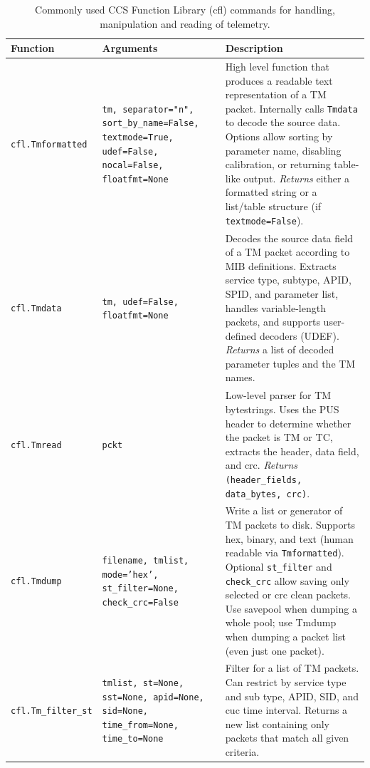 
\begin{table}[h!]
\centering
\renewcommand{\arraystretch}{1.3}
\setlength{\tabcolsep}{8pt}
\begin{tabular}{p{4cm} p{5cm} p{6cm}}
\hline
\textbf{Function} & \textbf{Arguments} & \textbf{Description} \\ 
\hline


\texttt{cfl.Tmformatted} & \texttt{tm, separator="n", sort\_by\_name=False, textmode=True, udef=False, nocal=False, floatfmt=None} &
High level function that produces a readable text representation of a TM packet.  
Internally calls \texttt{Tmdata} to decode the source data.  
Options allow sorting by parameter name, disabling calibration, or returning table-like output.  
\emph{Returns} either a formatted string or a list/table structure (if \texttt{textmode=False}). \\

\texttt{cfl.Tmdata} & \texttt{tm, udef=False, floatfmt=None} &
Decodes the source data field of a TM packet according to MIB definitions.  
Extracts service type, subtype, APID, SPID, and parameter list, handles variable-length packets,  
and supports user-defined decoders (UDEF).  
\emph{Returns} a list of decoded parameter tuples and the TM names. \\

\texttt{cfl.Tmread} & \texttt{pckt} &
Low-level parser for TM bytestrings.  
Uses the PUS header to determine whether the packet is TM or TC, extracts the header, data field, and crc. 
\emph{Returns} \texttt{(header\_fields, data\_bytes, crc)}. \\


\texttt{cfl.Tmdump} & \texttt{filename, tmlist, mode='hex', st\_filter=None, check\_crc=False} & 
Write a list or generator of TM packets to disk.  
Supports hex, binary, and text (human readable via \texttt{Tmformatted}).  
Optional \texttt{st\_filter} and \texttt{check\_crc} allow saving only selected or crc clean packets. 
Use savepool when dumping a whole pool; use Tmdump when dumping a packet list (even just one packet).\\


\texttt{cfl.Tm\_filter\_st} & \texttt{tmlist, st=None, sst=None, apid=None, sid=None, time\_from=None, time\_to=None} &
Filter for a list of TM packets.  
Can restrict by service type and sub type, APID, SID, and cuc time interval.  
Returns a new list containing only packets that match all given criteria. \\


\hline
\end{tabular}
\caption{Commonly used CCS Function Library (cfl) commands for handling, manipulation and reading of telemetry.}
\end{table}



